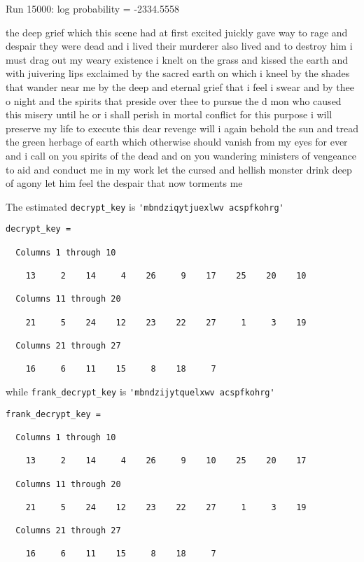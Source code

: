 \documentclass[a4paper,12pt]{exam}
\begin{document}
\begin{questions}
\begin{parts}
Run 15000: log probability = -2334.5558

the deep grief which this scene had at first excited juickly gave way to  rage and despair  they were dead  and i lived  their murderer also lived   and to destroy him i must drag out my weary existence  i knelt on the grass  and kissed the earth and with juivering lips exclaimed     by the  sacred earth on which i kneel  by the shades that wander near me  by the  deep and eternal grief that i feel  i swear  and by thee  o night  and the  spirits that preside over thee  to pursue the d  mon who caused this misery   until he or i shall perish in mortal conflict  for this purpose i will  preserve my life  to execute this dear revenge will i again behold the sun  and tread the green herbage of earth  which otherwise should vanish from my  eyes for ever  and i call on you  spirits of the dead  and on you  wandering  ministers of vengeance  to aid and conduct me in my work  let the cursed  and hellish monster drink deep of agony  let him feel the despair that now  torments me      


The estimated \verb|decrypt_key| is \verb|'mbndziqytjuexlwv acspfkohrg'|

\begin{verbatim}
decrypt_key =

  Columns 1 through 10

    13     2    14     4    26     9    17    25    20    10

  Columns 11 through 20

    21     5    24    12    23    22    27     1     3    19

  Columns 21 through 27

    16     6    11    15     8    18     7

\end{verbatim}

while \verb|frank_decrypt_key| is \verb|'mbndzijytquelxwv acspfkohrg'|

\begin{verbatim}
frank_decrypt_key =

  Columns 1 through 10

    13     2    14     4    26     9    10    25    20    17

  Columns 11 through 20

    21     5    24    12    23    22    27     1     3    19

  Columns 21 through 27

    16     6    11    15     8    18     7


\end{verbatim}
\end{parts}
\end{questions}
\end{document}
